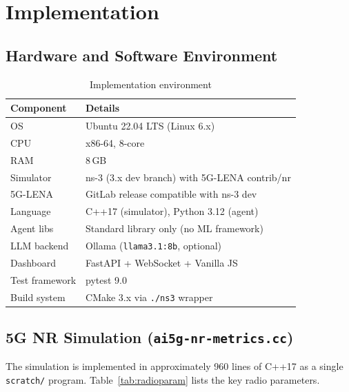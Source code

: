 \documentclass[12pt,a4paper]{article}
\begin{document}
\section{Implementation}
\label{sec:impl}

\subsection{Hardware and Software Environment}

\begin{table}[H]
\centering
\caption{Implementation environment}
\label{tab:env}
\begin{tabular}{ll}
\toprule
\textbf{Component} & \textbf{Details} \\
\midrule
OS             & Ubuntu 22.04 LTS (Linux 6.x) \\
CPU            & x86-64, 8-core \\
RAM            & 8\,GB \\
Simulator      & ns-3 (3.x dev branch) with 5G-LENA contrib/nr \\
5G-LENA        & GitLab release compatible with ns-3 dev \\
Language       & C++17 (simulator), Python 3.12 (agent) \\
Agent libs     & Standard library only (no ML framework) \\
LLM backend    & Ollama (\texttt{llama3.1:8b}, optional) \\
Dashboard      & FastAPI + WebSocket + Vanilla JS \\
Test framework & pytest 9.0 \\
Build system   & CMake 3.x via \texttt{./ns3} wrapper \\
\bottomrule
\end{tabular}
\end{table}

\subsection{5G NR Simulation (\texttt{ai5g-nr-metrics.cc})}

The simulation is implemented in approximately 960 lines of C++17 as a single
\texttt{scratch/} program. Table~\ref{tab:radioparam} lists the key radio
parameters.
\end{document}
